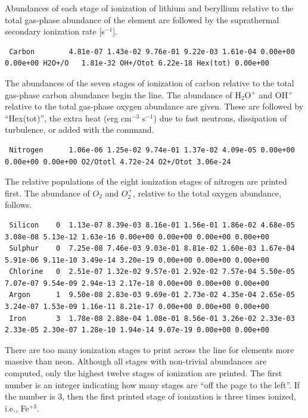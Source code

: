Abundances of each stage of ionization of lithium and beryllium relative
to the total gas-phase abundance of the element are followed by the
suprathermal secondary ionization rate [s$^{-1}$].
{\setverbatimfontsize{\tiny}
\begin{verbatim}
 Carbon        4.81e-07 1.43e-02 9.76e-01 9.22e-03 1.61e-04 0.00e+00 0.00e+00 H2O+/O   1.81e-32 OH+/Otot 6.22e-18 Hex(tot) 0.00e+00
\end{verbatim}
}

The abundances of the seven stages of ionization of carbon relative to
the total gas-phase carbon abundance begin the line.
The abundance of H$_2$O$^+$
and OH$^+$ relative to the total gas-phase oxygen abundance are given.  These
are followed by ``Hex(tot)'', the extra heat  (erg cm$^{-3}$ s$^{-1}$) due to fast
neutrons, dissipation of turbulence, or added with the
 command.

{\setverbatimfontsize{\tiny}
\begin{verbatim}
 Nitrogen      1.06e-06 1.25e-02 9.74e-01 1.37e-02 4.09e-05 0.00e+00 0.00e+00 0.00e+00 O2/Ototl 4.72e-24 O2+/Otot 3.06e-24
\end{verbatim}
}

The relative populations of the eight ionization stages of nitrogen are
printed first.
The abundance of $O_2$ and $O_2^+$, relative to the total oxygen
abundance, follows.
{\setverbatimfontsize{\tiny}
\begin{verbatim}
 Silicon    0  1.13e-07 8.39e-03 8.16e-01 1.56e-01 1.86e-02 4.68e-05 3.08e-08 5.13e-12 1.63e-16 0.00e+00 0.00e+00 0.00e+00 0.00e+00
 Sulphur    0  7.25e-08 7.46e-03 9.03e-01 8.81e-02 1.60e-03 1.67e-04 5.91e-06 9.11e-10 3.49e-14 3.20e-19 0.00e+00 0.00e+00 0.00e+00
 Chlorine   0  2.51e-07 1.32e-02 9.57e-01 2.92e-02 7.57e-04 5.50e-05 7.07e-07 9.54e-09 2.94e-13 2.17e-18 0.00e+00 0.00e+00 0.00e+00
 Argon      1  9.50e-08 2.83e-03 9.69e-01 2.73e-02 4.35e-04 2.65e-05 3.24e-07 1.53e-09 1.16e-11 8.21e-17 0.00e+00 0.00e+00 0.00e+00
 Iron       3  1.78e-08 2.88e-04 1.08e-01 8.56e-01 3.26e-02 2.33e-03 2.33e-05 2.30e-07 1.28e-10 1.94e-14 9.07e-19 0.00e+00 0.00e+00
\end{verbatim}
}

There are too many ionization stages to print across the line for elements
more massive than neon.
Although all stages with non-trivial abundances
are computed, only the highest twelve stages of ionization are printed.
The first number is an integer indicating how many stages are ``off the
page to the left''.
If the number is 3, then the first printed stage of
ionization is three times ionized, i.e., Fe$^{+3}$.

